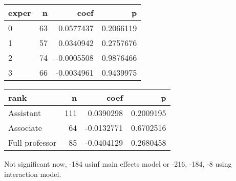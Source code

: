 \documentclass[]{article}
\newenvironment{Shaded}{\begin{snugshade}}{\end{snugshade}}
\newcommand{\DataTypeTok}[1]{\textcolor[rgb]{0.13,0.29,0.53}{#1}}
\newcommand{\DecValTok}[1]{\textcolor[rgb]{0.00,0.00,0.81}{#1}}
\newcommand{\KeywordTok}[1]{\textcolor[rgb]{0.13,0.29,0.53}{\textbf{#1}}}
\newcommand{\NormalTok}[1]{#1}
\newcommand{\OperatorTok}[1]{\textcolor[rgb]{0.81,0.36,0.00}{\textbf{#1}}}
\newcommand{\StringTok}[1]{\textcolor[rgb]{0.31,0.60,0.02}{#1}}
\begin{document}
\begin{longtable}[]{@{}lrrr@{}}
\toprule
exper & n & coef & p\tabularnewline
\midrule
\endhead
0 & 63 & 0.0577437 & 0.2066119\tabularnewline
1 & 57 & 0.0340942 & 0.2757676\tabularnewline
2 & 74 & -0.0005508 & 0.9876466\tabularnewline
3 & 66 & -0.0034961 & 0.9439975\tabularnewline
\bottomrule
\end{longtable}

\begin{Shaded}
\end{Shaded}

\begin{longtable}[]{@{}lrrr@{}}
\toprule
rank & n & coef & p\tabularnewline
\midrule
\endhead
Assistant & 111 & 0.0390298 & 0.2009195\tabularnewline
Associate & 64 & -0.0132771 & 0.6702516\tabularnewline
Full professor & 85 & -0.0404129 & 0.2680458\tabularnewline
\bottomrule
\end{longtable}

Not significant now, -184 usinf main effects model or -216, -184, -8
using interaction model.
\end{document}
